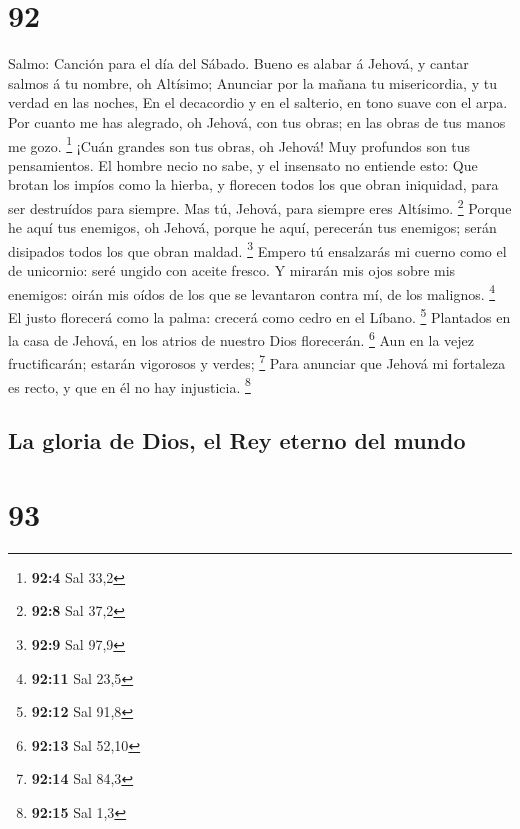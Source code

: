 \hypertarget{section-91}{%
\section{92}\label{section-91}}

 Salmo: Canción para el día del Sábado. Bueno es alabar á
Jehová, y cantar salmos á tu nombre, oh Altísimo;  Anunciar
por la mañana tu misericordia, y tu verdad en las noches, 
En el decacordio y en el salterio, en tono suave con el arpa.
 Por cuanto me has alegrado, oh Jehová, con tus obras; en
las obras de tus manos me gozo. \footnote{\textbf{92:4} Sal 33,2}
 ¡Cuán grandes son tus obras, oh Jehová! Muy profundos son
tus pensamientos.  El hombre necio no sabe, y el insensato
no entiende esto:  Que brotan los impíos como la hierba, y
florecen todos los que obran iniquidad, para ser destruídos para
siempre.  Mas tú, Jehová, para siempre eres Altísimo.
\footnote{\textbf{92:8} Sal 37,2}  Porque he aquí tus
enemigos, oh Jehová, porque he aquí, perecerán tus enemigos; serán
disipados todos los que obran maldad. \footnote{\textbf{92:9} Sal 97,9}
 Empero tú ensalzarás mi cuerno como el de unicornio: seré
ungido con aceite fresco.  Y mirarán mis ojos sobre mis
enemigos: oirán mis oídos de los que se levantaron contra mí, de los
malignos. \footnote{\textbf{92:11} Sal 23,5}  El justo
florecerá como la palma: crecerá como cedro en el Líbano. \footnote{\textbf{92:12}
  Sal 91,8}  Plantados en la casa de Jehová, en los atrios
de nuestro Dios florecerán. \footnote{\textbf{92:13} Sal 52,10}
 Aun en la vejez fructificarán; estarán vigorosos y verdes;
\footnote{\textbf{92:14} Sal 84,3}  Para anunciar que
Jehová mi fortaleza es recto, y que en él no hay injusticia. \footnote{\textbf{92:15}
  Sal 1,3}

\hypertarget{la-gloria-de-dios-el-rey-eterno-del-mundo}{%
\subsection{La gloria de Dios, el Rey eterno del
mundo}\label{la-gloria-de-dios-el-rey-eterno-del-mundo}}

\hypertarget{section-92}{%
\section{93}\label{section-92}}

